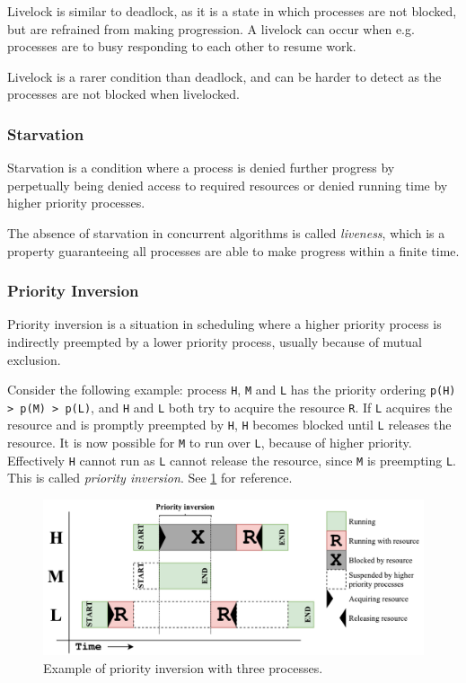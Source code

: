 Livelock is similar to deadlock, as it is a state in which processes are not blocked, but are refrained from making progression. A livelock can occur when e.g. processes are to busy responding to each other to resume work. 

Livelock is a rarer condition than deadlock, and can be harder to detect as the processes are not blocked when livelocked. 


\subsubsection{Starvation}


Starvation is a condition where a process is denied further progress by perpetually being denied access to required resources or denied running time by higher priority processes. 

The absence of starvation in concurrent algorithms is called \textit{liveness}, which is a property guaranteeing all processes are able to make progress within a finite time. 


\subsubsection{Priority Inversion}


Priority inversion is a situation in scheduling where a higher priority process is indirectly preempted by a lower priority process, usually because of mutual exclusion. 

Consider the following example: process \texttt{H}, \texttt{M} and \texttt{L} has the priority ordering \texttt{p(H) > p(M) > p(L)}, and \texttt{H} and \texttt{L} both try to acquire the resource \texttt{R}. If \texttt{L} acquires the resource and is promptly preempted by \texttt{H}, \texttt{H} becomes blocked until \texttt{L} releases the resource. It is now possible for \texttt{M} to run over \texttt{L}, because of higher priority. Effectively \texttt{H} cannot run as \texttt{L} cannot release the resource, since \texttt{M} is preempting \texttt{L}. This is called \textit{priority inversion}. See \cref{fig:priority_inversion} for reference.

\begin{figure}[h!]
    \centering
    \includegraphics[width=\linewidth]{fig/priority_inversion}
    \caption{Example of priority inversion with three processes.}
    \label{fig:priority_inversion}
\end{figure}


